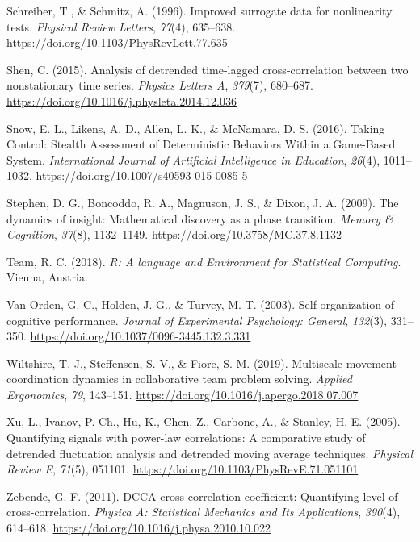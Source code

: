 \documentclass[
  man]{apa6}
\newlength{\cslhangindent}
\newlength{\cslentryspacingunit} %
\newenvironment{CSLReferences}[2] %
 {%
  \setlength{\parindent}{0pt}
  \ifodd #1
  \let\oldpar\par
  \def\par{\hangindent=\cslhangindent\oldpar}
  \fi
  \setlength{\parskip}{#2\cslentryspacingunit}
 }%
 {}
\begin{document}
\begin{CSLReferences}{1}{0}
\leavevmode{}%
Schreiber, T., \& Schmitz, A. (1996). Improved surrogate data for nonlinearity tests. \emph{Physical Review Letters}, \emph{77}(4), 635--638. \url{https://doi.org/10.1103/PhysRevLett.77.635}

\leavevmode{}%
Shen, C. (2015). Analysis of detrended time-lagged cross-correlation between two nonstationary time series. \emph{Physics Letters A}, \emph{379}(7), 680--687. \url{https://doi.org/10.1016/j.physleta.2014.12.036}

\leavevmode{}%
Snow, E. L., Likens, A. D., Allen, L. K., \& McNamara, D. S. (2016). Taking Control: Stealth Assessment of Deterministic Behaviors Within a Game-Based System. \emph{International Journal of Artificial Intelligence in Education}, \emph{26}(4), 1011--1032. \url{https://doi.org/10.1007/s40593-015-0085-5}

\leavevmode{}%
Stephen, D. G., Boncoddo, R. A., Magnuson, J. S., \& Dixon, J. A. (2009). The dynamics of insight: {Mathematical} discovery as a phase transition. \emph{Memory \& Cognition}, \emph{37}(8), 1132--1149. \url{https://doi.org/10.3758/MC.37.8.1132}

\leavevmode{}%
Team, R. C. (2018). \emph{R: {A} language and {Environment} for {Statistical} {Computing}}. Vienna, Austria.

\leavevmode{}%
Van Orden, G. C., Holden, J. G., \& Turvey, M. T. (2003). Self-organization of cognitive performance. \emph{Journal of Experimental Psychology: General}, \emph{132}(3), 331--350. \url{https://doi.org/10.1037/0096-3445.132.3.331}

\leavevmode{}%
Wiltshire, T. J., Steffensen, S. V., \& Fiore, S. M. (2019). Multiscale movement coordination dynamics in collaborative team problem solving. \emph{Applied Ergonomics}, \emph{79}, 143--151. \url{https://doi.org/10.1016/j.apergo.2018.07.007}

\leavevmode{}%
Xu, L., Ivanov, P. Ch., Hu, K., Chen, Z., Carbone, A., \& Stanley, H. E. (2005). Quantifying signals with power-law correlations: A comparative study of detrended fluctuation analysis and detrended moving average techniques. \emph{Physical Review E}, \emph{71}(5), 051101. \url{https://doi.org/10.1103/PhysRevE.71.051101}

\leavevmode{}%
Zebende, G. F. (2011). {DCCA} cross-correlation coefficient: {Quantifying} level of cross-correlation. \emph{Physica A: Statistical Mechanics and Its Applications}, \emph{390}(4), 614--618. \url{https://doi.org/10.1016/j.physa.2010.10.022}

\end{CSLReferences}

\endgroup
\end{document}
